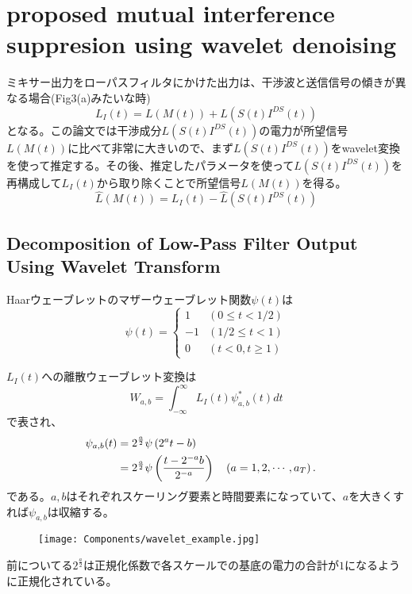 \section{proposed mutual interference suppresion using wavelet denoising}
ミキサー出力をローパスフィルタにかけた出力は、干渉波と送信信号の傾きが異なる場合(Fig3(a)みたいな時)
\begin{equation}
    L_{I}(t)=L(M(t))+L\left(S(t) I^{D S}(t)\right)
\end{equation}
となる。この論文では干渉成分$L\left(S(t) I^{D S}(t)\right)$の電力が所望信号$L(M(t))$に比べて非常に大きいので、まず$L\left(S(t) I^{D S}(t)\right)$をwavelet変換を使って推定する。その後、推定したパラメータを使って$L\left(S(t) I^{D S}(t)\right)$を再構成して$L_I(t)$から取り除くことで所望信号$L(M(t))$を得る。
\begin{equation}
    \hat{L}(M(t))=L_{I}(t)-\hat{L}\left(S(t) I^{D S}(t)\right)
\end{equation}

\subsection{Decomposition of Low-Pass Filter Output Using Wavelet Transform}
Haarウェーブレットのマザーウェーブレット関数$\psi(t)$は
\begin{equation}
    \psi(t)=\left\{\begin{array}{lc}
    1 & (0 \leq t<1 / 2) \\
    -1 & (1 / 2 \leq t<1) \\
    0 & (t<0, t \geq 1)
    \end{array}\right.
\end{equation}

$L_I(t)$への離散ウェーブレット変換は
\begin{equation}
    W_{a, b}=\int_{-\infty}^{\infty} L_{I}(t) \psi_{a, b}^{*}(t) d t
\end{equation}
で表され、
\begin{align}
    \psi_{a, b}(t) &= 2^{\frac{a}{2}} \psi\left(2^{a} t-b\right)\cr
                   &= 2^{\frac{a}{2}} \psi\left(\frac{t-2^{-a}b}{2^{-a}}\right) \quad\left(a=1,2, \cdots, a_{T}\right) .
\end{align}
である。$a,b$はそれぞれスケーリング要素と時間要素になっていて、$a$を大きくすれば$\psi_{a,b}$は収縮する。
\begin{figure}[H]
    \centering
    \texttt{[image: Components/wavelet\_example.jpg]}    
\end{figure}

前についてる$2^{\frac{a}{2}}$は正規化係数で各スケールでの基底の電力の合計が$1$になるように正規化されている。
